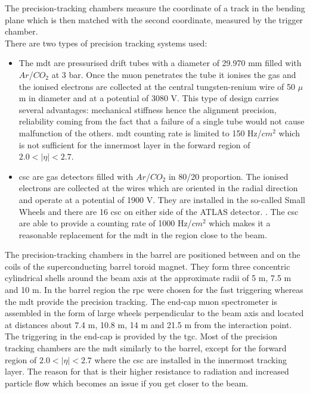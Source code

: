 	The precision-tracking chambers measure the coordinate of a track in the bending plane which is then matched with the second coordinate, measured by the trigger chamber. \\
	There are two types of precision tracking systems used:
	\begin{itemize}
	\item The \gls{mdt} are pressurised drift tubes with a diameter of 29.970 mm filled with $Ar$/$CO_2$ at 3 bar. Once the muon penetrates the tube it ionises the gas and the ionised electrons are collected at the central tungsten-renium wire of 50 $\mu$m in diameter and at a potential of 3080 V. This type of design carries several advantages: mechanical stiffness hence the alignment precision, reliability coming from the fact that a failure of a single tube would not cause malfunction of the others. \gls{mdt} counting rate is limited to 150 Hz/$cm^2$ which is not sufficient for the innermost layer in the forward region of $2.0 < |\eta| < 2.7$.
	\item \gls{csc} are gas detectors filled with $Ar$/$CO_2$ in 80/20 proportion. The ionised electrons are collected at the wires which are oriented in the radial direction and operate at a potential of 1900 V. They are installed in the so-called Small Wheels and there are 16  \gls{csc} on either side of the ATLAS detector. . The \gls{csc} are able to provide a counting rate of 1000 Hz/$cm^2$ which makes it a reasonable replacement for the \gls{mdt} in the region close to the beam.
	\end{itemize} 
	 The precision-tracking chambers in the barrel are positioned between and on the coils of the superconducting barrel toroid magnet. They form three concentric cylindrical shells around the beam axis at the approximate radii of 5 m, 7.5 m and 10 m. In the barrel region the \gls{rpc} were chosen for the fast triggering whereas the \gls{mdt} provide the precision tracking. 
	 The end-cap muon spectrometer is assembled in the form of large wheels perpendicular to the beam axis and located at distances about 7.4 m, 10.8 m, 14 m and 21.5 m from the interaction point. The triggering in the end-cap is provided by the \gls{tgc}. Most of the precision tracking chambers are the \gls{mdt}  similarly to the barrel, except for the forward region of $2.0 < |\eta| < 2.7$ where the \gls{csc} are installed in the innermost tracking layer. The reason for that is their higher resistance to radiation and increased particle flow which becomes an issue if you get closer to the beam. \\
